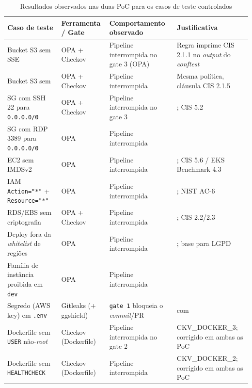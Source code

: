 \begin{table}[!ht]
\centering
\caption{Resultados observados nas duas PoC para os casos de teste controlados}
\label{tab:resultados-testes}
\renewcommand{\arraystretch}{1.05}
\setlength{\tabcolsep}{4pt}
\scriptsize
\begin{tabular}{|L{4.0cm}|L{2.4cm}|L{2.6cm}|L{5.0cm}|}
\hline
\textbf{Caso de teste} & \textbf{Ferramenta / Gate} & \textbf{Comportamento observado} & \textbf{Justificativa} \\
\hline
Bucket S3 sem SSE & OPA + Checkov & Pipeline interrompida no gate 3 (OPA) & Regra  imprime CIS 2.1.1 no \textit{output} do \textit{conftest} \\
\hline
Bucket S3 sem  & OPA + Checkov & Pipeline interrompida & Mesma política, cláusula CIS 2.1.5 \\
\hline
SG com SSH 22 para \texttt{0.0.0.0/0} & OPA + Checkov & Pipeline interrompida no gate 3 & ; CIS 5.2 \\
\hline
SG com RDP 3389 para \texttt{0.0.0.0/0} & OPA & Pipeline interrompida &  \\
\hline
EC2 sem IMDSv2 & OPA & Pipeline interrompida & ; CIS 5.6 / EKS Benchmark 4.3 \\
\hline
IAM \texttt{Action="*"} + \texttt{Resource="*"} & OPA & Pipeline interrompida & ; NIST AC-6 \\
\hline
RDS/EBS sem criptografia & OPA + Checkov & Pipeline interrompida & ; CIS 2.2/2.3 \\
\hline
Deploy fora da \textit{whitelist} de regiões & OPA & Pipeline interrompida & ; base para LGPD \\
\hline
Família de instância proibida em \texttt{dev} & OPA & Pipeline interrompida &  \\
\hline
Segredo (AWS key) em \texttt{.env} & Gitleaks (+ ggshield) & \texttt{gate 1} bloqueia o \textit{commit}/PR &  com  \\
\hline
Dockerfile sem \texttt{USER} não-\textit{root} & Checkov (Dockerfile) & Pipeline interrompida no gate 2 & CKV\_DOCKER\_3; corrigido em ambas as PoC \\
\hline
Dockerfile sem \texttt{HEALTHCHECK} & Checkov (Dockerfile) & Pipeline interrompida & CKV\_DOCKER\_2; corrigido em ambas as PoC \\

\end{tabular}
\end{table}

